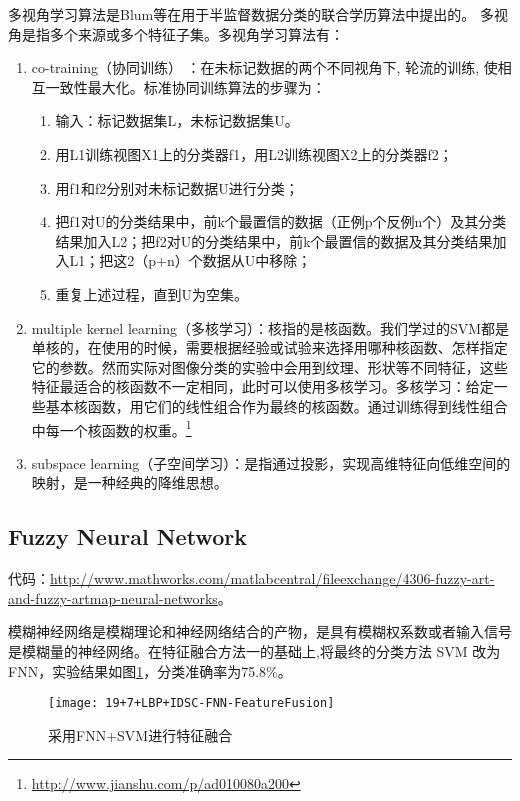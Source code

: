 多视角学习算法是Blum等\cite{blum1998combining}在用于半监督数据分类的联合学历算法中提出的。
多视角是指多个来源或多个特征子集。多视角学习算法有：
\begin{enumerate}
\item co-training（协同训练） ：在未标记数据的两个不同视角下, 轮流的训练, 使相互一致性最大化。标准协同训练算法的步骤为：
    \begin{enumerate}
    \item 输入：标记数据集L，未标记数据集U。
    \item 用L1训练视图X1上的分类器f1，用L2训练视图X2上的分类器f2；
    \item 用f1和f2分别对未标记数据U进行分类；
    \item 把f1对U的分类结果中，前k个最置信的数据（正例p个反例n个）及其分类结果加入L2；把f2对U的分类结果中，前k个最置信的数据及其分类结果加入L1；把这2（p+n）个数据从U中移除；
    \item 重复上述过程，直到U为空集。
    \end{enumerate}
\item multiple kernel learning（多核学习）：核指的是核函数。我们学过的SVM都是单核的，在使用的时候，需要根据经验或试验来选择用哪种核函数、怎样指定它的参数。然而实际对图像分类的实验中会用到纹理、形状等不同特征，这些特征最适合的核函数不一定相同，此时可以使用多核学习。多核学习：给定一些基本核函数，用它们的线性组合作为最终的核函数。通过训练得到线性组合中每一个核函数的权重。\footnote{\url{http://www.jianshu.com/p/ad010080a200}}
\item subspace learning（子空间学习）：是指通过投影，实现高维特征向低维空间的映射，是一种经典的降维思想。
\end{enumerate}

\subsection{Fuzzy Neural Network}
代码：\url{http://www.mathworks.com/matlabcentral/fileexchange/4306-fuzzy-art-and-fuzzy-artmap-neural-networks}。

模糊神经网络是模糊理论和神经网络结合的产物，是具有模糊权系数或者输入信号是模糊量的神经网络。在特征融合方法一的基础上,将最终的分类方法 SVM 改为FNN，实验结果如图\ref{fig:19+7+LBP+IDSC-FNN-FeatureFusion}，分类准确率为75.8\%。
\begin{figure}[!ht]
\centering
\texttt{[image: 19+7+LBP+IDSC-FNN-FeatureFusion]}
\caption{采用FNN+SVM进行特征融合}
\label{fig:19+7+LBP+IDSC-FNN-FeatureFusion}
\end{figure}


